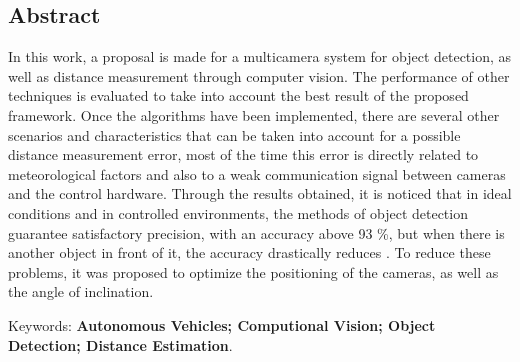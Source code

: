 \begin{flushright}
\chapter*{Abstract}
\end{flushright}

\noindent
In this work, a proposal is made for a multicamera system for object detection, as well as distance measurement through computer vision. The performance of other techniques is evaluated to take into account the best result of the proposed framework. Once the algorithms have been implemented, there are several other scenarios and characteristics that can be taken into account for a possible distance measurement error, most of the time this error is directly related to meteorological factors and also to a weak communication signal between cameras and the control hardware. Through the results obtained, it is noticed that in ideal conditions and in controlled environments, the methods of object detection guarantee satisfactory precision, with an accuracy above 93 \%, but when there is another object in front of it, the accuracy drastically reduces . To reduce these problems, it was proposed to optimize the positioning of the cameras, as well as the angle of inclination.


\noindent
Keywords: \textbf{Autonomous Vehicles; Computional Vision; Object Detection; Distance Estimation}.